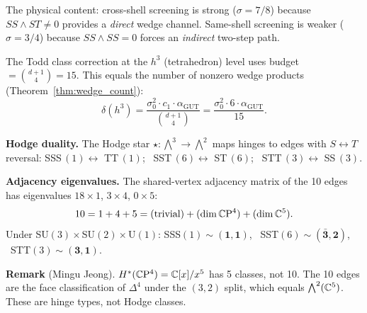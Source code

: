 The physical content: cross-shell screening is strong ($\sigma = 7/8$) because $SS \wedge ST \neq 0$ provides a \emph{direct} wedge channel.  Same-shell screening is weaker ($\sigma = 3/4$) because $SS \wedge SS = 0$ forces an \emph{indirect} two-step path.

\begin{theorem}
The Todd class correction at the $h^3$ (tetrahedron) level uses budget $= \binom{d+1}{4} = 15$.  This equals the number of nonzero wedge products (Theorem~\ref{thm:wedge_count}):
\[
\delta(h^3) = \frac{\sigma_0^2 \cdot c_1 \cdot \alpha_\text{GUT}}{\binom{d+1}{4}}
= \frac{\sigma_0^2 \cdot 6 \cdot \alpha_\text{GUT}}{15}.
\]
\end{theorem}

\noindent\textbf{Hodge duality.}
The Hodge star $\star\!: \bigwedge^3 \to \bigwedge^2$ maps hinges to edges with $S \leftrightarrow T$ reversal:
SSS$\,(1) \leftrightarrow$ TT$\,(1)$; \ SST$\,(6) \leftrightarrow$ ST$\,(6)$; \ STT$\,(3) \leftrightarrow$ SS$\,(3)$.

\smallskip\noindent\textbf{Adjacency eigenvalues.}
The shared-vertex adjacency matrix of the 10 edges has eigenvalues $18 \times 1$, $3 \times 4$, $0 \times 5$:
\[
10 = 1 + 4 + 5 = (\text{trivial}) + (\dim\mathbb{C}\mathrm{P}^4) + (\dim\mathbb{C}^5).
\]
Under SU$(3) \times$SU$(2) \times$U$(1)$:
SSS$(1) \sim (\mathbf{1},\mathbf{1})$, \
SST$(6) \sim (\bar{\mathbf{3}},\mathbf{2})$, \
STT$(3) \sim (\mathbf{3},\mathbf{1})$.

\smallskip\noindent\textbf{Remark} (Mingu Jeong).
$H^*(\mathbb{C}\mathrm{P}^4) = \mathbb{C}[x]/x^5$ has 5 classes, not 10.  The 10 edges are the face classification of $\Delta^4$ under the $(3,2)$ split, which equals $\bigwedge^2(\mathbb{C}^5)$.  These are hinge types, not Hodge classes.
